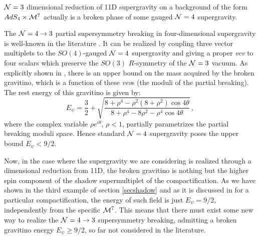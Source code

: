 \documentclass[a4paper,11pt]{article}
\begin{document}
${\cal N}=3$ dimensional reduction of 11D supergravity on a
background of the form $AdS_4\times{\cal M}^7$ actually is a
broken phase of some gauged ${\cal N}=4$ supergravity.
\par
The ${\cal N}=4\to 3$ partial supersymmetry breaking in
four-dimensional supergravity is well-known in the literature
\cite{wageman}. It can be realized by coupling three vector
multiplets to the $SO(4)$-gauged ${\cal N}=4$ supergravity and
giving a proper {\it vev} to four scalars which preserve the
$SO(3)$ $R$-symmetry of the ${\cal N}=3$ vacuum. As explicitly
shown in \cite{noi}, there is an upper bound on the mass acquired
by the broken gravitino, which is a function of these {\it vev}s
(the moduli of the partial breaking). The rest energy of this
gravitino is given by:
\begin{equation}
  E_{\psi}=\frac{3}{2}+\sqrt{\frac{8+\rho^4
  -\rho^2 (8+\rho^2)\cos 4 \theta}
  {8+\rho^4-8\rho^2-\rho^4\cos 4 \theta}}\,,
\end{equation}
where the complex variable $\rho e^{i\theta}$, $\rho<1$, partially
parametrizes the partial breaking moduli space. Hence standard
${\cal N}=4$ supergravity poses the upper bound $E_{\psi} < 9/2$.
\par
Now, in the case where the supergravity we are considering is
realized through a dimensional reduction from 11D, the broken
gravitino is nothing but the higher spin component of the shadow
supermultiplet of the compactification. As we have shown in the
third example of section \ref{secshadow} and as it is discussed in
\cite{N010} for a particular compactification, the energy of such
field is just $E_{\psi} = 9/2$, independently from the specific
${\cal M}^7$. This means that there must exist some new way to
realize the ${\cal N}=4\to 3$ supersymmetry breaking, admitting a
broken gravitino energy $E_{\psi}\geq 9/2$, so far not considered
in the literature.
%
%
\end{document}

